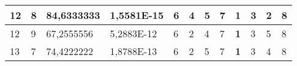 \documentclass[conference]{IEEEtran}
\begin{document}
\begin{table*}[]
\begin{tabular}{|llll|llllllll|}
\multicolumn{1}{|l|}{12}                                                    & \multicolumn{1}{l|}{8}                                                        & \multicolumn{1}{l|}{84,6333333}                                                   & 1,5581E-15                     & \multicolumn{1}{l|}{6}                                                  & \multicolumn{1}{l|}{4}                                                  & \multicolumn{1}{l|}{5}                                                  & \multicolumn{1}{l|}{7}                                                  & \multicolumn{1}{l|}{\textbf{1}}                                         & \multicolumn{1}{l|}{3}                                                  & \multicolumn{1}{l|}{2}                                                  & 8                          \\ \hline
\multicolumn{1}{|l|}{12}                                                    & \multicolumn{1}{l|}{9}                                                        & \multicolumn{1}{l|}{67,2555556}                                                   & 5,2883E-12                     & \multicolumn{1}{l|}{6}                                                  & \multicolumn{1}{l|}{2}                                                  & \multicolumn{1}{l|}{4}                                                  & \multicolumn{1}{l|}{7}                                                  & \multicolumn{1}{l|}{\textbf{1}}                                         & \multicolumn{1}{l|}{3}                                                  & \multicolumn{1}{l|}{5}                                                  & 8                          \\ \hline
\multicolumn{1}{|l|}{13}                                                    & \multicolumn{1}{l|}{7}                                                        & \multicolumn{1}{l|}{74,4222222}                                                   & 1,8788E-13                     & \multicolumn{1}{l|}{6}                                                  & \multicolumn{1}{l|}{2}                                                  & \multicolumn{1}{l|}{5}                                                  & \multicolumn{1}{l|}{7}                                                  & \multicolumn{1}{l|}{\textbf{1}}                                         & \multicolumn{1}{l|}{3}                                                  & \multicolumn{1}{l|}{4}                                                  & 8                          \\ \hline

\end{tabular}
\end{table*}
\end{document}
